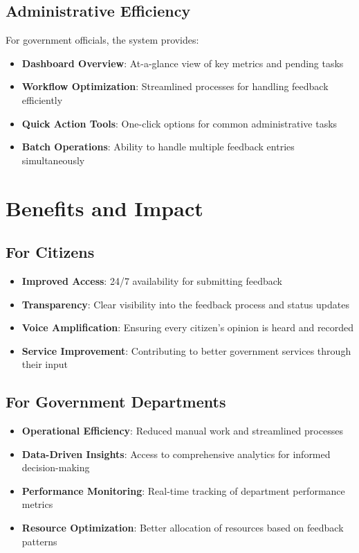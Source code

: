 \documentclass[12pt,a4paper]{article}
\begin{document}
\subsection{Administrative Efficiency}

For government officials, the system provides:

\begin{itemize}[leftmargin=2em]
    \item \textbf{Dashboard Overview}: At-a-glance view of key metrics and pending tasks
    \item \textbf{Workflow Optimization}: Streamlined processes for handling feedback efficiently
    \item \textbf{Quick Action Tools}: One-click options for common administrative tasks
    \item \textbf{Batch Operations}: Ability to handle multiple feedback entries simultaneously
\end{itemize}

\section{Benefits and Impact}

\subsection{For Citizens}

\begin{itemize}[leftmargin=2em]
    \item \textbf{Improved Access}: 24/7 availability for submitting feedback
    \item \textbf{Transparency}: Clear visibility into the feedback process and status updates
    \item \textbf{Voice Amplification}: Ensuring every citizen's opinion is heard and recorded
    \item \textbf{Service Improvement}: Contributing to better government services through their input
\end{itemize}

\subsection{For Government Departments}

\begin{itemize}[leftmargin=2em]
    \item \textbf{Operational Efficiency}: Reduced manual work and streamlined processes
    \item \textbf{Data-Driven Insights}: Access to comprehensive analytics for informed decision-making
    \item \textbf{Performance Monitoring}: Real-time tracking of department performance metrics
    \item \textbf{Resource Optimization}: Better allocation of resources based on feedback patterns
\end{itemize}
\end{document}
